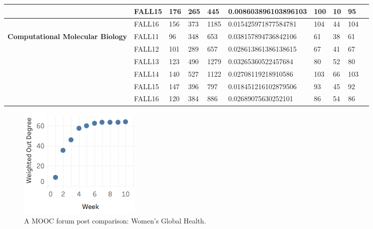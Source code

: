 \begin{table}[]
{\begin{tabular}{@{}llllllllll@{}}
                  & FALL15   & 176   & 265   & 445                           & 0.008603896103896103 & 100                 & 10                                           & 95                                         \\ \hline
                  & FALL16   & 156   & 373   & 1185                          & 0.015425971877584781 & 104                 & 44                                           & 104  \\ \hline                                     
\textbf{Computational Molecular Biology} & FALL11   & 96    & 348   & 653                            & 0.038157894736842106 & 61                  & 38                                           & 61                                         \\ \hline
                  & FALL12   & 101   & 289   & 657                           & 0.028613861386138615 & 67                  & 41                                           & 67                                         \\ \hline
                  & FALL13   & 123   & 490   & 1279                          & 0.03265360522457684  & 80                  & 52                                           & 80                                         \\ \hline
                  & FALL14   & 140   & 527   & 1122                          & 0.02708119218910586  & 103                 & 66                                           & 103                                        \\ \hline
                  & FALL15   & 147   & 396   & 797                           & 0.018451216102879506 & 93                  & 45                                           & 92                                         \\ \hline
                  & FALL16   & 120   & 384   & 886                           & 0.02689075630252101  & 86                  & 54                                           & 86                                        
\end{tabular}
}
\end{table}


\begin{figure}[htp]
       \centering
       \includegraphics{Figs/women_health_summer2015_top10.png}
       \caption{\textnormal{A MOOC forum post comparison: Women's
           Global Health.}}
       \label{fig:womenHealth}
\end{figure}


